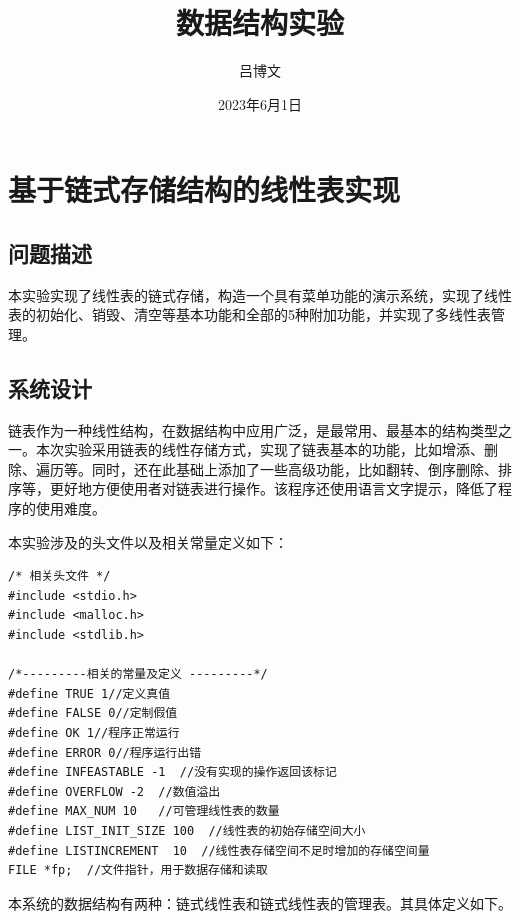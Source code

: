 \documentclass[supercite]{Experimental_Report}
\title{~~~~~~数据结构实验~~~~~~}
\author{吕博文}
\date{2023年6月1日}
\theoremstyle{definition}
\begin{document}
\maketitle


\clearpage


\tableofcontents[level=2]

\clearpage


\section{基于链式存储结构的线性表实现}


\subsection{问题描述}

本实验实现了线性表的链式存储，构造一个具有菜单功能的演示系统，实现了线性表的初始化、销毁、清空等基本功能和全部的5种附加功能，并实现了多线性表管理。

\subsection{系统设计}

链表作为一种线性结构，在数据结构中应用广泛，是最常用、最基本的结构类型之一。本次实验采用链表的线性存储方式，实现了链表基本的功能，比如增添、删除、遍历等。同时，还在此基础上添加了一些高级功能，比如翻转、倒序删除、排序等，更好地方便使用者对链表进行操作。该程序还使用语言文字提示，降低了程序的使用难度。

本实验涉及的头文件以及相关常量定义如下：
\begin{lstlisting}[title = 相关常量定义]
/* 相关头文件 */
#include <stdio.h>
#include <malloc.h>
#include <stdlib.h>

/*---------相关的常量及定义 ---------*/
#define TRUE 1//定义真值 
#define FALSE 0//定制假值 
#define OK 1//程序正常运行 
#define ERROR 0//程序运行出错 
#define INFEASTABLE -1  //没有实现的操作返回该标记
#define OVERFLOW -2  //数值溢出 
#define MAX_NUM 10   //可管理线性表的数量
#define LIST_INIT_SIZE 100  //线性表的初始存储空间大小
#define LISTINCREMENT  10  //线性表存储空间不足时增加的存储空间量
FILE *fp;  //文件指针，用于数据存储和读取
\end{lstlisting}

本系统的数据结构有两种：链式线性表和链式线性表的管理表。其具体定义如下。
\end{document}
